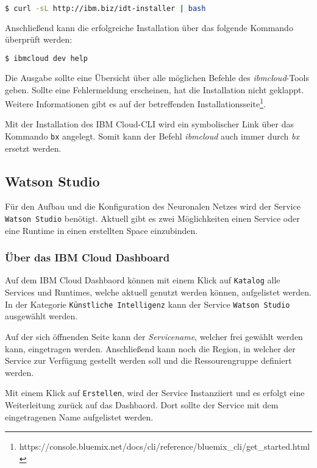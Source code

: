 \begin{lstlisting}[language=bash, caption=Installation des IBM Cloud CLI, label=Installation des IBM Cloud CLI]
    $ curl -sL http://ibm.biz/idt-installer | bash
\end{lstlisting}

Anschließend kann die erfolgreiche Installation über das folgende Kommando überprüft werden:

\begin{lstlisting}[language=bash, caption=Installation des CLI überprüfen, label=Installation des CLI überprüfen]
    $ ibmcloud dev help
\end{lstlisting}

Die Ausgabe sollte eine Übersicht über alle möglichen Befehle des \textit{ibmcloud}-Tools geben. Sollte eine Fehlermeldung
erscheinen, hat die Installation nicht geklappt. Weitere Informationen gibt es auf der betreffenden
Installationsseite\footnote{https://console.bluemix.net/docs/cli/reference/bluemix\_cli/get\_started.html}.

Mit der Installation des IBM Cloud-CLI wird ein symbolischer Link über das Kommando \texttt{bx} angelegt. Somit kann der
Befehl \textit{ibmcloud} auch immer durch \textit{bx} ersetzt werden.

\subsection{Watson Studio}
Für den Aufbau und die Konfiguration des Neuronalen Netzes wird der Service \texttt{Watson Studio} benötigt. Aktuell gibt
es zwei Möglichkeiten einen Service oder eine Runtime in einen erstellten Space einzubinden.

\subsubsection*{Über das IBM Cloud Dashboard}
Auf dem IBM Cloud Dashbaord können mit einem Klick auf \texttt{Katalog} alle Services und Runtimes, welche aktuell genutzt
werden können, aufgelistet werden. In der Kategorie \texttt{Künstliche Intelligenz} kann der Service \texttt{Watson Studio}
ausgewählt werden.

Auf der sich öffnenden Seite kann der \textit{Servicename}, welcher frei gewählt werden kann, eingetragen werden.
Anschließend kann noch die Region, in welcher der Service zur Verfügung gestellt werden soll und die Ressourengruppe
definiert werden.

Mit einem Klick auf \texttt{Erstellen}, wird der Service Instanziiert und es erfolgt eine Weiterleitung zurück auf das
Dashbaord. Dort sollte der Service mit dem eingetragenen Name aufgelistet werden.

